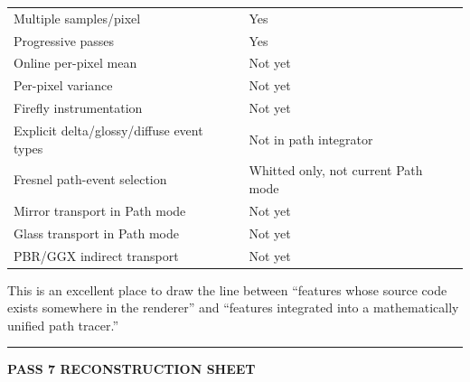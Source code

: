 {\begin{longtable}[]{@{}
  >{\raggedright\arraybackslash}p{}
  >{\raggedright\arraybackslash}p{}@{}}
Multiple samples/pixel & Yes \\
Progressive passes & Yes \\
Online per-pixel mean & Not yet \\
Per-pixel variance & Not yet \\
Firefly instrumentation & Not yet \\
Explicit delta/glossy/diffuse event types & Not in path integrator \\
Fresnel path-event selection & Whitted only, not current Path mode \\
Mirror transport in Path mode & Not yet \\
Glass transport in Path mode & Not yet \\
PBR/GGX indirect transport & Not yet \\
\end{longtable}
}

This is an excellent place to draw the line between ``features whose source code exists somewhere in the renderer'' and ``features integrated into a mathematically unified path tracer.''

\begin{center}\rule{0.5\linewidth}{0.5pt}\end{center}

\textbf{PASS 7 RECONSTRUCTION SHEET}

